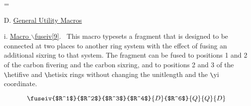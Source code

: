 
  \nofiles                          
  \def\LATEX{\LaTeX}
  \let\TEX = \TeX               
  \setcounter{totalnumber}{5}   
  \setcounter{topnumber}{3}     
  \setcounter{bottomnumber}{3}
  \setlength{\oddsidemargin}{3.9cm}     %
  \setlength{\textwidth}{5.7in}         %
  \setlength{\topmargin}{1cm}
  \setlength{\headheight}{.6cm}
  \setlength{\textheight}{8.5in}
  \setlength{\parindent}{1cm}
  \renewcommand{\baselinestretch}{1.5}
  \raggedbottom
  \setlength{\itemsep}{-2mm}
  
  
  
  
      
  \setcounter{page}{70}
  \setcounter{chapter}{6}
  =\tenrm
  \initial
  \newcommand{\rhq}{An argument of ``Q'' causes no action. \ }
  \newcommand{\ri}{All other argument values cause no action. }
  
 \vspace{\len mm}
 \noindent D. \underline{General Utility Macros}

 \vspace{\len mm}
 \indent i. \underline{Macro $\backslash $fuseiv[9]}.
 \ This macro typesets a fragment that is designed to be
 connected at two places to another ring system with the
 effect of fusing an additional sixring to that system.
 The fragment can be fused to positions 1 and 2 of the
 carbon fivering and the carbon sixring, and to positions
 2 and 3 of the \verb+\+hetifive and \verb+\+hetisix rings
 without changing
 the unitlength and the \verb+\+yi coordinate.
   

 \[ \fuseiv{$R^1$}{$R^2$}{$R^3$}{$R^4$}{D}{$R^6$}{Q}{Q}{D} \]

